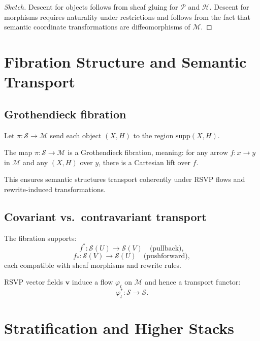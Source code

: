 \begin{proof}[Sketch]
Descent for objects follows from sheaf gluing for $\mathscr{P}$ and $\mathscr{H}$.
Descent for morphisms requires naturality under restrictions and follows from
the fact that semantic coordinate transformations are diffeomorphisms of
$\mathcal{M}$.
\end{proof}

\section{Fibration Structure and Semantic Transport}

\subsection{Grothendieck fibration}

Let $\pi:\mathcal{S}\to\mathcal{M}$ send each object $(X,H)$ to the region
$\mathrm{supp}(X,H)$.

\begin{definition}
The map $\pi:\mathcal{S}\to\mathcal{M}$ is a Grothendieck fibration, meaning:
for any arrow $f:x\to y$ in $\mathcal{M}$ and any $(X,H)$ over $y$, there is a
Cartesian lift over $f$.
\end{definition}

\begin{remark}
This ensures semantic structures transport coherently under RSVP flows and
rewrite-induced transformations.
\end{remark}

\subsection{Covariant vs.\ contravariant transport}

The fibration supports:
\[
f^\ast : \mathcal{S}(U) \to \mathcal{S}(V) \quad \text{(pullback)},
\]
\[
f_\ast : \mathcal{S}(V) \to \mathcal{S}(U) \quad \text{(pushforward)},
\]
each compatible with sheaf morphisms and rewrite rules.

RSVP vector fields $\mathbf{v}$ induce a flow $\varphi_t$ on $\mathcal{M}$ and
hence a transport functor:
\[
\varphi_t^\ast : \mathcal{S} \to \mathcal{S}.
\]

\section{Stratification and Higher Stacks}

